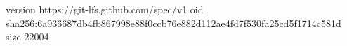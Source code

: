 version https://git-lfs.github.com/spec/v1
oid sha256:6a936687db4fb867998e88f0ccb76e882d112ae4fd7f530fa25cd5f1714c581d
size 22004
